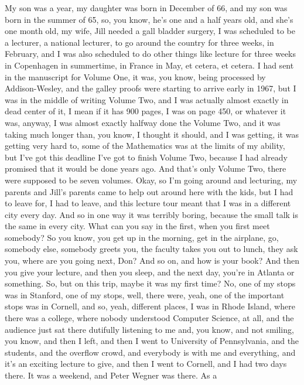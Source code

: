 \documentclass[]{article}
\begin{document}
My son was a year, my daughter was born in December of 66, and my son
was born in the summer of 65, so, you know, he's one and a half years
old, and she's one month old, my wife, Jill needed a gall bladder
surgery, I was scheduled to be a lecturer, a national lecturer, to go
around the country for three weeks, in February, and I was also
scheduled to do other things like lecture for three weeks in Copenhagen
in summertime, in France in May, et cetera, et cetera. I had sent in the
manuscript for Volume One, it was, you know, being processed by
Addison-Wesley, and the galley proofs were starting to arrive early in
1967, but I was in the middle of writing Volume Two, and I was actually
almost exactly in dead center of it, I mean if it has 900 pages, I was
on page 450, or whatever it was, anyway, I was almost exactly halfway
done the Volume Two, and it was taking much longer than, you know, I
thought it should, and I was getting, it was getting very hard to, some
of the Mathematics was at the limits of my ability, but I've got this
deadline I've got to finish Volume Two, because I had already promised
that it would be done years ago. And that's only Volume Two, there were
supposed to be seven volumes. Okay, so I'm going around and lecturing,
my parents and Jill's parents came to help out around here with the
kids, but I had to leave for, I had to leave, and this lecture tour
meant that I was in a different city every day. And so in one way it was
terribly boring, because the small talk is the same in every city. What
can you say in the first, when you first meet somebody? So you know, you
get up in the morning, get in the airplane, go, somebody else, somebody
greets you, the faculty takes you out to lunch, they ask you, where are
you going next, Don? And so on, and how is your book? And then you give
your lecture, and then you sleep, and the next day, you're in Atlanta or
something. So, but on this trip, maybe it was my first time? No, one of
my stops was in Stanford, one of my stops, well, there were, yeah, one
of the important stops was in Cornell, and so, yeah, different places, I
was in Rhode Island, where there was a college, where nobody understood
Computer Science, at all, and the audience just sat there dutifully
listening to me and, you know, and not smiling, you know, and then I
left, and then I went to University of Pennsylvania, and the students,
and the overflow crowd, and everybody is with me and everything, and
it's an exciting lecture to give, and then I went to Cornell, and I had
two days there. It was a weekend, and Peter Wegner was there. As a
\end{document}
